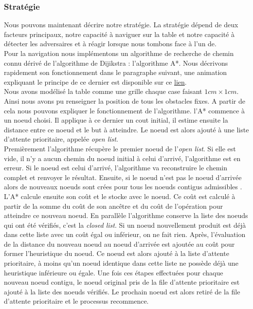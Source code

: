 \documentclass[a4paper,10pt]{article}
\begin{document}
\begin{spacing}{1.5}
\subsubsection{Stratégie}
Nous pouvons maintenant décrire notre stratégie. La stratégie dépend de deux
facteurs principaux, notre capacité à naviguer sur la table et notre capacité à
détecter les adversaires et à réagir lorsque nous tombons face à l'un de.
\\ \indent Pour la navigation nous implémentons un algorithme de recherche de
chemin connu dérivé de l'algorithme de Dijikstra : l'algorithme A*. Nous
décrivons rapidement son fonctionnement dans le paragraphe suivant, une
animation expliquant le principe de ce dernier est disponible sur ce
\href{https://fr.wikipedia.org/wiki/Algorithme_A*#/media/Fichier:Astar_progress_animation.gif}{lien}.\\ \indent
Nous avons modélisé la table comme une grille chaque case faisant $1 cm \times 1
cm$. Ainsi nous avons pu renseigner la position de tous les obstacles fixes. A
partir de cela nous pouvons expliquer le fonctionnement de l'algorithme. l'A*
commence à un noeud choisi. Il applique à ce dernier un cout initial, il estime
ensuite la distance entre ce noeud et le but à atteindre. Le noeud est alors
ajouté à une liste d'attente prioritaire, appelée \textit{open list}. \\ \indent
Premièrement l'algorithme récupère le premier noeud de l'\textit{open list}. Si
elle est vide, il n'y a aucun chemin du noeud initial à celui d'arrivé,
l'algorithme est en erreur. Si le noeud est celui d'arrivé, l'algorithme va
reconstruire le chemin complet et renvoyer le résultat. Ensuite, si le noeud
n'est pas le noeud d'arrivée alors de nouveaux noeuds sont crées pour tous les
noeuds contigus admissibles . L'A* calcule ensuite son coût et le stocke avec le
noeud. Ce coût est calculé à partir de la somme du coût de son ancêtre et du
coût de l'opération pour atteindre ce nouveau noeud. En parallèle l'algorithme
conserve la liste des noeuds qui ont été vérifiés, c'est la \textit{closed
  list}. Si un noeud nouvellement produit est déjà dans cette liste avec un coût
égal ou inférieur, on ne fait rien. Après, l'évaluation de la distance du
nouveau noeud au noeud d'arrivée est ajoutée au coût pour former l'heuristique
du noeud. Ce noeud est alors ajouté à la liste d'attente prioritaire, à moins
qu'un noeud identique dans cette liste ne possède déjà une heuristique
inférieure ou égale. Une fois ces étapes effectuées pour chaque nouveau noeud
contigu, le noeud original pris de la file d'attente prioritaire est ajouté à la
liste des noeuds vérifiés. Le prochain noeud est alors retiré de la file
d'attente prioritaire et le processus recommence.


\end{spacing}
\end{document}
